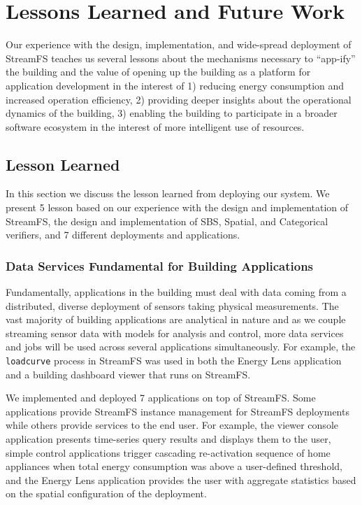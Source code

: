 
\chapter{Lessons Learned and Future Work}
\label{chap:future}

Our experience with the design, implementation, and wide-spread deployment of StreamFS teaches us several lessons about
the mechanisms necessary to ``app-ify'' the building and the value of opening up the building as a platform for application 
development in the interest of 1) reducing energy consumption and increased operation efficiency, 2) providing deeper
insights about the operational dynamics of the building, 3) enabling the building to participate in a broader
software ecosystem in the interest of more intelligent use of resources. 

\section{Lesson Learned}
In this section we discuss the lesson learned from deploying our system.  We present 5 lesson based on our
experience with the design and implementation of StreamFS, the design and implementation of SBS, Spatial,
and Categorical verifiers, and 7 different deployments and applications.



\subsection{Data Services Fundamental for Building Applications}
Fundamentally, applications in the building must deal with data coming from a distributed, diverse deployment of sensors
taking physical measurements.  The vast majority of building applications are analytical in nature and as we couple
streaming sensor data with models for analysis and control, more data services and jobs will be used across 
several applications simultaneously.  For example, the \texttt{loadcurve} process in StreamFS was used in both 
the Energy Lens application and a building dashboard viewer that runs on StreamFS.

We implemented and deployed 7 applications on top of StreamFS.  Some applications provide StreamFS instance management 
for StreamFS deployments while others provide services to the end user.  For example, the viewer console application
 presents time-series query results 
and displays them to the user, simple control applications trigger cascading re-activation sequence of home appliances when total energy consumption
was above a user-defined threshold, and the Energy Lens application provides the user with aggregate statistics based on
the spatial configuration of the deployment.

